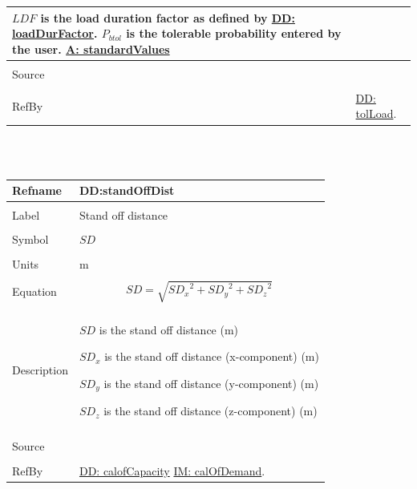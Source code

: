 \documentclass[12pt]{article}
\begin{document}
\begin{minipage}{\textwidth}
\begin{tabular}{p{} p{}}
        $LDF$ is the load duration factor as defined by \hyperref[DD:loadDurFactor]{DD: loadDurFactor}.
        ${P_{btol}}$ is the tolerable probability entered by the user.
        \hyperref[A:standardValues]{A: standardValues}
\\ \midrule \\
Source & \cite{astm2009}
\\ \midrule \\
RefBy & \hyperref[DD:tolLoad]{DD: tolLoad}.
\\ \bottomrule \end{tabular}
\end{minipage}\\
~\newline
\noindent \begin{minipage}{\textwidth}
\begin{tabular}{p{} p{}}
\toprule \textbf{Refname} & \textbf{DD:standOffDist}
\label{DD:standOffDist}
\\ \midrule \\
Label & Stand off distance
\\ \midrule \\
Symbol & $SD$
\\ \midrule \\
Units & m
\\ \midrule \\
Equation & \begin{dmath}
           SD=\sqrt{{SD_{x}}^{2}+{SD_{y}}^{2}+{SD_{z}}^{2}}
           \end{dmath}
\\ \midrule \\
Description & \begin{symbDescription}
              \item{$SD$ is the stand off distance (m)}
              \item{${SD_{x}}$ is the stand off distance (x-component) (m)}
              \item{${SD_{y}}$ is the stand off distance (y-component) (m)}
              \item{${SD_{z}}$ is the stand off distance (z-component) (m)}
              \end{symbDescription}
\\ \midrule \\
Source & \cite{astm2009}
\\ \midrule \\
RefBy & \hyperref[DD:calofCapacity]{DD: calofCapacity} \hyperref[IM:calOfDemand]{IM: calOfDemand}.
\\ \bottomrule \end{tabular}
\end{minipage}\\
\end{document}
